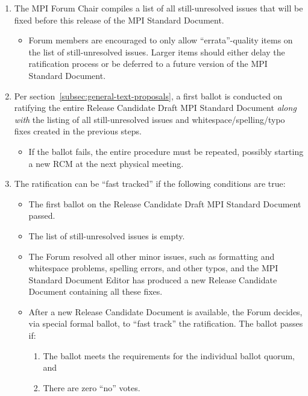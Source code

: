 \begin{enumerate}
\begin{enumerate}
  \item The MPI Forum Chair compiles a list of all still-unresolved
    issues that will be fixed before this release of the MPI Standard
    Document.
    \begin{itemize}
    \item Forum members are encouraged to only allow
      ``errata''-quality items on the list of still-unresolved
      issues.  Larger items should either delay the ratification
      process or be deferred to a future version of the MPI Standard
      Document.
    \end{itemize}

  \item Per section~\ref{subsec:general-text-proposals}, a first
    ballot is conducted on ratifying the entire Release Candidate
    Draft MPI Standard Document {\em along with} the listing of all
    still-unresolved issues and whitespace/spelling/typo fixes created
    in the previous steps.
    \begin{itemize}
    \item If the ballot fails, the entire procedure must be repeated,
      possibly starting a new RCM at the next physical meeting.
    \end{itemize}

  \item The ratification can be ``fast tracked'' if the following
    conditions are true:

    \begin{itemize}
    \item The first ballot on the Release Candidate Draft MPI Standard
      Document passed.
    \item  The list of still-unresolved issues is empty.
    \item The Forum resolved all other minor issues, such as
      formatting and whitespace problems, spelling errors, and other
      typos, and the MPI Standard Document Editor has produced a new
      Release Candidate Document containing all these fixes.
    \item After a new Release Candidate Document is available, the
      Forum decides, via special formal ballot, to ``fast track'' the
      ratification.  The ballot passes if:
      \begin{enumerate}
      \item The ballot meets the requirements for the individual
        ballot quorum, and
      \item There are zero ``no'' votes.
      \end{enumerate}
    \end{itemize}


\end{enumerate}
\end{enumerate}
